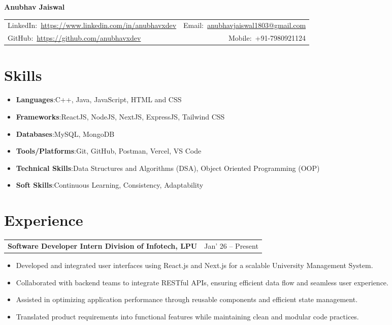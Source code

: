 \documentclass[10pt, a4paper]{article}
\makeatletter
\newcommand{\entryrow}[2]{%
  \noindent\begin{tabularx}{\linewidth}{@{}X@{\hspace{4pt}}r@{}}
    {\color{headingblue}\bfseries\fontsize{8.5pt}{10pt}\selectfont #1} &
    {\fontsize{8.5pt}{10pt}\selectfont #2}
  \end{tabularx}\par\vspace{1pt}%
}
\makeatother
\begin{document}
{\color{headingblue}\bfseries\fontsize{18pt}{22pt}\selectfont Anubhav Jaiswal}\par
\vspace{3pt}
\begin{tabularx}{\linewidth}{@{}X@{}r@{}}
  {\fontsize{8.5pt}{10pt}\selectfont LinkedIn:~\href{https://www.linkedin.com/in/anubhavxdev}{https://www.linkedin.com/in/anubhavxdev}} &
  {\fontsize{8.5pt}{10pt}\selectfont Email:~\href{mailto:anubhavjaiswal1803@gmail.com}{anubhavjaiswal1803@gmail.com}} \\[1pt]
  {\fontsize{8.5pt}{10pt}\selectfont GitHub:~\href{https://github.com/anubhavxdev}{https://github.com/anubhavxdev}} &
  {\fontsize{8.5pt}{10pt}\selectfont Mobile:~+91-7980921124}
\end{tabularx}

\section{Skills}
\begin{itemize}
  \item {\color{headingblue}\bfseries Languages}:\enspace C++, Java, JavaScript, HTML and CSS
  \item {\color{headingblue}\bfseries Frameworks}:\enspace ReactJS, NodeJS, NextJS, ExpressJS, Tailwind CSS
  \item {\color{headingblue}\bfseries Databases}:\enspace MySQL, MongoDB
  \item {\color{headingblue}\bfseries Tools/Platforms}:\enspace Git, GitHub, Postman, Vercel, VS Code
  \item {\color{headingblue}\bfseries Technical Skills}:\enspace Data Structures and Algorithms (DSA), Object Oriented Programming (OOP)
  \item {\color{headingblue}\bfseries Soft Skills}:\enspace Continuous Learning, Consistency, Adaptability
\end{itemize}

\section{Experience}

\entryrow{Software Developer Intern \textbar{} Division of Infotech, LPU}{Jan' 26 -- Present}
\begin{itemize}
  \item Developed and integrated user interfaces using React.js and Next.js for a scalable University Management System.
  \item Collaborated with backend teams to integrate RESTful APIs, ensuring efficient data flow and seamless user experience.
  \item Assisted in optimizing application performance through reusable components and efficient state management.
  \item Translated product requirements into functional features while maintaining clean and modular code practices.
\end{itemize}
\end{document}
